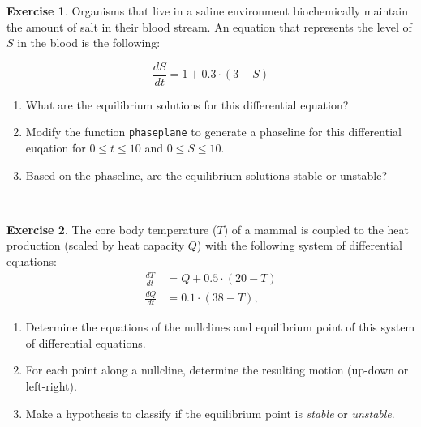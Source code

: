 \documentclass[
]{book}
\theoremstyle{definition}
\theoremstyle{definition}
\theoremstyle{definition}
\newtheorem{exercise}{Exercise}[chapter]
\theoremstyle{remark}
\begin{document}
\begin{exercise}
\protect\hypertarget{exr:unnamed-chunk-107}{}{\label{exr:unnamed-chunk-107} }Organisms that live in a saline environment biochemically maintain the amount of salt in their blood stream. An equation that represents the level of \(S\) in the blood is the following:

\[ \frac{dS}{dt} = 1 + 0.3 \cdot (3 - S) \]

\begin{enumerate}[label=\alph*.]
\item What are the equilibrium solutions for this differential equation?
\item Modify the function \texttt{phaseplane} to generate a phaseline for this differential euqation for $0 \leq t \leq 10$ and $0 \leq S \leq 10$.
\item Based on the phaseline, are the equilibrium solutions stable or unstable?
\end{enumerate}
\end{exercise}

~

\begin{exercise}
\protect\hypertarget{exr:unnamed-chunk-108}{}{\label{exr:unnamed-chunk-108} }The core body temperature (\(T\)) of a mammal is coupled to the heat production (scaled by heat capacity \(Q\)) with the following system of differential equations:
\begin{equation}
\begin{split}
\frac{dT}{dt} &= Q + 0.5 \cdot (20-T) \\ 
\frac{dQ}{dt} &= 0.1 \cdot (38-T),
\end{split}
\end{equation}

\begin{enumerate}[label=\alph*.]
 \item Determine the equations of the nullclines and equilibrium point of this system of differential equations.
\item For each point along a nullcline, determine the resulting motion (up-down or left-right).
\item  Make a hypothesis to classify if the equilibrium point is \emph{stable} or \emph{unstable}.
\end{enumerate}
\end{exercise}

~
\end{document}
